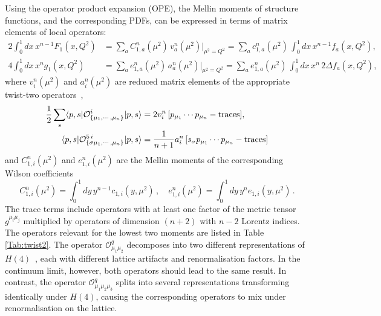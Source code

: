 Using the operator product expansion (OPE), the Mellin moments of structure functions, and the corresponding PDFs, can be expressed in terms of matrix elements of local operators:
\begin{align}
\!\!\!2 \int_0^1 dx\, x^{n-1} F_1(x,Q^2) &= \sum_a C_{1,a}^n(\mu^2)\, v_a^n(\mu^2)|_{\mu^2=Q^2} = \sum_a c_{1,a}^n(\mu^2)\, \int_0^1 dx\, x^{n-1} f_a(x,Q^2),\\
4 \int_0^1 dx\, x^n g_1(x,Q^2) &= \sum_a e_{1,a}^n(\mu^2)\, a_a^n(\mu^2)|_{\mu^2=Q^2} = \sum_a e_{1,a}^n(\mu^2)\, \int_0^1 dx\, x^n\, 2 \Delta f_a(x,Q^2),
\end{align}
where $v_i^n(\mu^2)$ and $a_i^n(\mu^2)$ are reduced matrix elements of the appropriate twist-two operators~\cite{Gockeler:1995wg},
\begin{align}
\frac{1}{2} \sum_s \langle p,s|\mathcal{O}^i_{\{\mu_1,\cdots,\mu_n\}}|p,s\rangle = {} & 2 v_i^n\, [p_{\mu_1}\cdots p_{\mu_n} - {\rm traces}] , \label{eq:twist2me}\\
\langle p,s|\mathcal{O}^{5\,i}_{\{\sigma \mu_1,\cdots,\mu_n\}}|p,s\rangle = {} & \frac{1}{n+1} a_i^n\, [s_\sigma p_{\mu_1}\cdots p_{\mu_n} - {\rm traces}]
\end{align}
and $C_{1,i}^n(\mu^2)$ and $e_{1,i}^n(\mu^2)$ are the Mellin moments of the corresponding Wilson coefficients
\begin{equation}
C_{1,i}^n(\mu^2) = \int_0^1 dy\, y^{n-1} c_{1,i}(y,\mu^2)\,, \quad
e_{1,i}^n(\mu^2) = \int_0^1 dy\, y^n e_{1,i}(y,\mu^2)\,.
\end{equation}
The trace terms include operators with at least one factor of the metric tensor $g^{\mu_i \mu_j}$ multiplied by
operators of dimension $(n+2)$ with $n-2$ Lorentz indices. The operators relevant for the lowest two moments are listed in Table \ref{Tab:twist2}. The operator $\mathcal{O}^q_{\mu_1\mu_2}$ decomposes into two different representations of $H(4)$~\cite{Gockeler:1996mu}, each with different lattice artifacts and renormalisation factors. In the continuum limit, however, both operators should lead to the same result. In contrast, the operator $\mathcal{O}^q_{\mu_1\mu_2\mu_3}$ splits into several representations transforming identically under $H(4)$, causing the corresponding operators to mix under renormalisation on the lattice.
